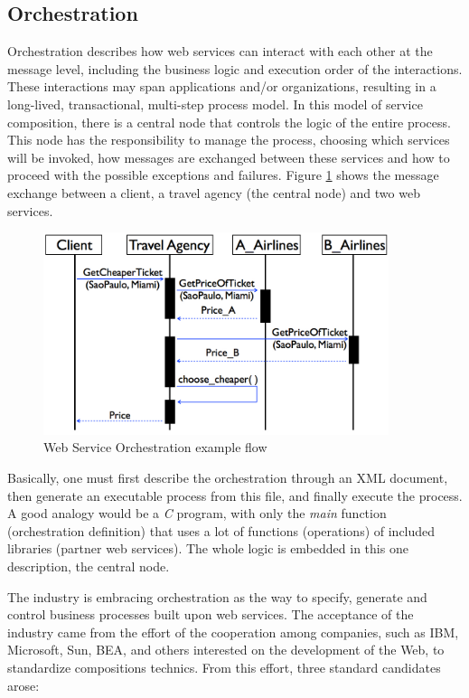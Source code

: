 \subsection{Orchestration}
Orchestration describes how web services can interact with each other at the message level, including the business logic and execution order of the interactions. These interactions may span applications and/or organizations, resulting in a long-lived, transactional, multi-step process model. In this model of service composition, there is a central node that controls the logic of the entire process. This node has the responsibility to manage the process, choosing which services will be invoked, how messages are exchanged between these services and how to proceed with the possible exceptions and failures. Figure \ref{BPELexample} shows the message exchange between a client, a travel agency (the central node) and two web services.

\begin{figure}[h]
  \centering
  \includegraphics[width=0.9\textwidth]{images/BPELexample}
  \caption{Web Service Orchestration example flow}
  \label{BPELexample}
\end{figure}

Basically, one must first describe the orchestration through an XML document, then generate an executable process from this file, and finally execute the process. A good analogy would be a \emph{C} program, with only the \emph{main} function (orchestration definition) that uses a lot of functions (operations) of included libraries (partner web services). The whole logic is embedded in this one description, the central node. 

The industry is embracing orchestration as the way to specify, generate and control business processes built upon web services. The acceptance of the industry came from the effort of the cooperation among companies, such as IBM, Microsoft, Sun, BEA, and others interested on the development of the Web, to standardize compositions technics. From this effort, three standard candidates arose:

